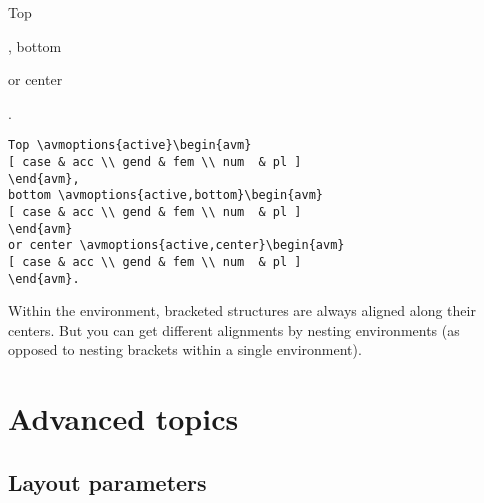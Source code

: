 \begin{examples}
\item
Top \begin{avm}
\end{avm},
bottom \begin{avm}
\end{avm}
or center \begin{avm}
\end{avm}.

\item
{\obeyspaces\begin{verbatim}
Top \avmoptions{active}\begin{avm}
[ case & acc \\ gend & fem \\ num  & pl ]
\end{avm},
bottom \avmoptions{active,bottom}\begin{avm}
[ case & acc \\ gend & fem \\ num  & pl ]
\end{avm}
or center \avmoptions{active,center}\begin{avm}
[ case & acc \\ gend & fem \\ num  & pl ]
\end{avm}.
\end{verbatim}}
\end{examples}
Within the {\AVM} environment, bracketed structures are always aligned
along their centers.  But you can get different alignments by nesting
{\AVM} environments (as opposed to nesting brackets within a single {\AVM} environment).

\section{Advanced topics}

\subsection{Layout parameters}

